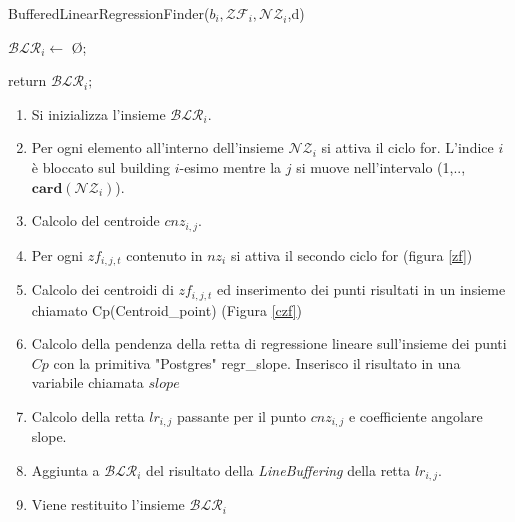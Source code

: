 \begin{algorithm}[H]
	
	\IncMargin{1em}
	\caption{BufferedLinearRegressionFinder($b_i , \mathcal{ZF}_i , \mathcal{NZ}_i$,d)}
	\label{alg:four}
	\BlankLine
	\SetAlgoNoLine
	$\mathcal{BLR}_i \leftarrow$ \O ;\\
	
	return $\mathcal{BLR}_i;$
	
\end{algorithm}

\begin{enumerate}
	\item Si inizializza l'insieme $\mathcal{BLR}_i$.
	\item Per ogni elemento all'interno dell'insieme $\mathcal{NZ}_i$ si attiva il ciclo for. L'indice $i$ è bloccato sul building $i$-esimo mentre la $j$ si muove nell'intervalo (1,..,$\mathbf{card}(\mathcal{NZ}_i)$).
	\item Calcolo del centroide $cnz_{i,j}$.
	\item Per ogni $zf_{i,j,t}$ contenuto in $nz_i$ si attiva il secondo ciclo for (figura \ref{zf}) 
	\item Calcolo dei centroidi di $zf_{i,j,t}$ ed inserimento dei punti risultati in un insieme chiamato Cp(Centroid\_point) (Figura \ref{czf})
	\item Calcolo della pendenza della retta di regressione lineare sull'insieme dei punti $Cp$ con la primitiva "Postgres" regr\_slope. Inserisco il risultato in una variabile chiamata $slope$
	\item Calcolo della retta $lr_{i,j}$ passante per il punto $cnz_{i,j}$ e coefficiente angolare slope.
	\item Aggiunta a $\mathcal{BLR}_i$ del risultato della \textit{LineBuffering} della retta $lr_{i,j}$.
	\item Viene restituito l'insieme $\mathcal{BLR}_i$
\end{enumerate}


